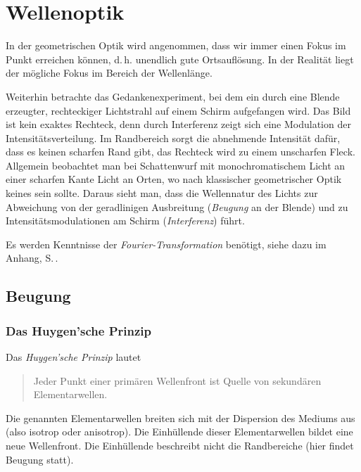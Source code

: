 
\chapter{Wellenoptik}

In der geometrischen Optik wird angenommen, dass wir immer einen
Fokus im Punkt erreichen können, d.\,h. unendlich gute Ortsauflösung.
In der Realität liegt der mögliche Fokus im Bereich der Wellenlänge.

Weiterhin betrachte das Gedankenexperiment, bei dem ein durch eine Blende
erzeugter, rechteckiger Lichtstrahl auf einem Schirm aufgefangen wird.
Das Bild ist kein exaktes Rechteck, denn durch Interferenz zeigt sich
eine Modulation der Intensitätsverteilung. Im Randbereich sorgt die
abnehmende Intensität dafür, dass es keinen scharfen Rand gibt, das
Rechteck wird zu einem unscharfen Fleck.
Allgemein beobachtet man bei Schattenwurf mit monochromatischem Licht
an einer scharfen Kante Licht an Orten, wo nach klassischer
geometrischer Optik keines sein sollte.
Daraus sieht man, dass die Wellennatur des Lichts zur
Abweichung von der geradlinigen Ausbreitung (\emph{Beugung} an
der Blende) und zu Intensitätsmodulationen am Schirm
(\emph{Interferenz}) führt.

Es werden Kenntnisse der \emph{Fourier-Transformation} benötigt, siehe
dazu  im Anhang, S.\,\pageref{fouriertrafo}.




\section{Beugung}
\subsection{Das Huygen'sche Prinzip}
Das \emph{Huygen'sche Prinzip} lautet
\begin{quote}
  Jeder Punkt einer primären Wellenfront ist Quelle von sekundären
  Elementarwellen.
\end{quote}
Die genannten Elementarwellen breiten sich mit der Dispersion des
Mediums aus (also isotrop oder anisotrop).
Die Einhüllende dieser Elementarwellen bildet eine neue Wellenfront.
Die Einhüllende beschreibt nicht die Randbereiche (hier findet Beugung statt).

